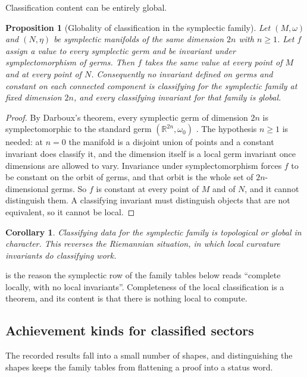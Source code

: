 \documentclass[11pt,letterpaper]{article}
\newtheorem{proposition}[theorem]{Proposition}
\newtheorem{corollary}[theorem]{Corollary}
\theoremstyle{definition}
\theoremstyle{remark}
\begin{document}
Classification content can be entirely global.

\begin{proposition}[Globality of classification in the symplectic family]
\label{prop:globality}
Let $(M, \omega)$ and $(N, \eta)$ be symplectic manifolds of the same dimension $2n$ with $n \geq 1$. Let $f$ assign a value to every symplectic germ and be invariant under symplectomorphism of germs. Then $f$ takes the same value at every point of $M$ and at every point of $N$. Consequently no invariant defined on germs and constant on each connected component is classifying for the symplectic family at fixed dimension $2n$, and every classifying invariant for that family is global.
\end{proposition}

\begin{proof}
By Darboux's theorem, every symplectic germ of dimension $2n$ is symplectomorphic to the standard germ $(\mathbb{R}^{2n}, \omega_0)$ \cite{darboux}. The hypothesis $n \geq 1$ is needed: at $n = 0$ the manifold is a disjoint union of points and a constant invariant does classify it, and the dimension itself is a local germ invariant once dimensions are allowed to vary. Invariance under symplectomorphism forces $f$ to be constant on the orbit of germs, and that orbit is the whole set of $2n$-dimensional germs. So $f$ is constant at every point of $M$ and of $N$, and it cannot distinguish them. A classifying invariant must distinguish objects that are not equivalent, so it cannot be local.
\end{proof}

\begin{corollary}
\label{cor:topological}
Classifying data for the symplectic family is topological or global in character. This reverses the Riemannian situation, in which local curvature invariants do classifying work.
\end{corollary}

 is the reason the symplectic row of the family tables below reads ``complete locally, with no local invariants''. Completeness of the local classification is a theorem, and its content is that there is nothing local to compute.

\subsection{Achievement kinds for classified sectors}
\label{sec:kinds}

The recorded results fall into a small number of shapes, and distinguishing the shapes keeps the family tables from flattening a proof into a status word.
\end{document}
